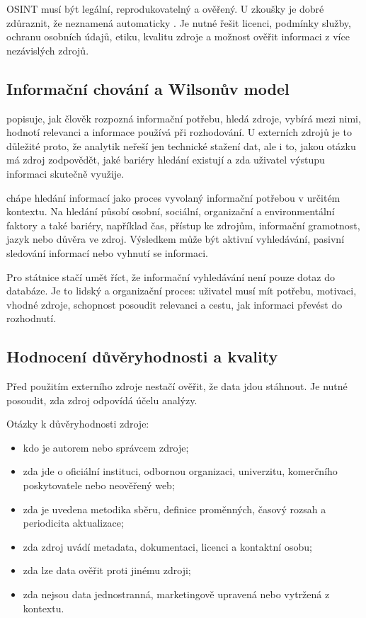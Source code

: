 OSINT musí být legální, reprodukovatelný a ověřený. U zkoušky je dobré zdůraznit, že  neznamená automaticky . Je nutné řešit licenci, podmínky služby,
ochranu osobních údajů, etiku, kvalitu zdroje a možnost ověřit informaci z více nezávislých zdrojů.

\subsection{Informační chování a Wilsonův model}
 popisuje, jak člověk rozpozná informační potřebu, hledá zdroje, vybírá mezi
nimi, hodnotí relevanci a informace používá při rozhodování. U externích zdrojů je to důležité proto,
že analytik neřeší jen technické stažení dat, ale i to, jakou otázku má zdroj zodpovědět, jaké bariéry
hledání existují a zda uživatel výstupu informaci skutečně využije.

 chápe hledání informací jako proces vyvolaný informační potřebou v určitém
kontextu. Na hledání působí osobní, sociální, organizační a environmentální faktory a také bariéry,
například čas, přístup ke zdrojům, informační gramotnost, jazyk nebo důvěra ve zdroj. Výsledkem může
být aktivní vyhledávání, pasivní sledování informací nebo vyhnutí se informaci.

Pro státnice stačí umět říct, že informační vyhledávání není pouze dotaz do databáze. Je to lidský
a organizační proces: uživatel musí mít potřebu, motivaci, vhodné zdroje, schopnost posoudit relevanci
a cestu, jak informaci převést do rozhodnutí.

\subsection{Hodnocení důvěryhodnosti a kvality}
Před použitím externího zdroje nestačí ověřit, že data jdou stáhnout. Je nutné posoudit, zda zdroj
odpovídá účelu analýzy.

Otázky k důvěryhodnosti zdroje:
\begin{itemize}
  \item kdo je autorem nebo správcem zdroje;
  \item zda jde o oficiální instituci, odbornou organizaci, univerzitu, komerčního poskytovatele
  nebo neověřený web;
  \item zda je uvedena metodika sběru, definice proměnných, časový rozsah a periodicita aktualizace;
  \item zda zdroj uvádí metadata, dokumentaci, licenci a kontaktní osobu;
  \item zda lze data ověřit proti jinému zdroji;
  \item zda nejsou data jednostranná, marketingově upravená nebo vytržená z kontextu.
\end{itemize}

